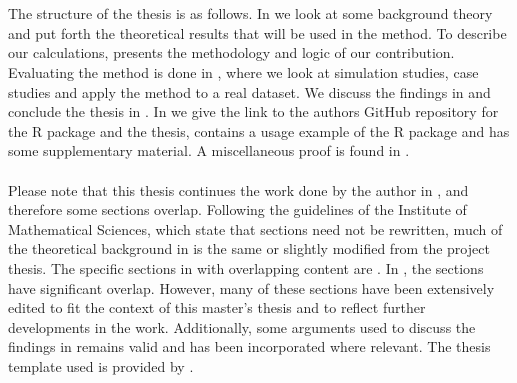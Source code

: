 \\
\\
The structure of the thesis is as follows. In  we look at some background theory and put forth the theoretical results that will be used in the method. To describe our calculations,  presents the methodology and logic of our contribution. Evaluating the method is done in , where we look at simulation studies, case studies and apply the method to a real dataset. We discuss the findings in  and conclude the thesis in . In  we give the link to the authors GitHub repository for the R package and the thesis,  contains a usage example of the R package and  has some supplementary material. A miscellaneous proof is found in . 
\\
\\
Please note that this thesis continues the work done by the author in \citet{Arnstad:Relative_variable_importance_in_Bayesian_linear_mixed_models:2024}, and therefore some sections overlap. Following the guidelines of the Institute of Mathematical Sciences, which state that sections need not be rewritten, much of the theoretical background in  is the same or slightly modified from the project thesis. The specific sections in  with overlapping content are . In , the sections  have significant overlap. However, many of these sections have been extensively edited to fit the context of this master's thesis and to reflect further developments in the work. Additionally, some arguments used to discuss the findings in \citet{Arnstad:Relative_variable_importance_in_Bayesian_linear_mixed_models:2024} remains valid and has been incorporated where relevant. The thesis template used is provided by \citet{salvesen_template}.